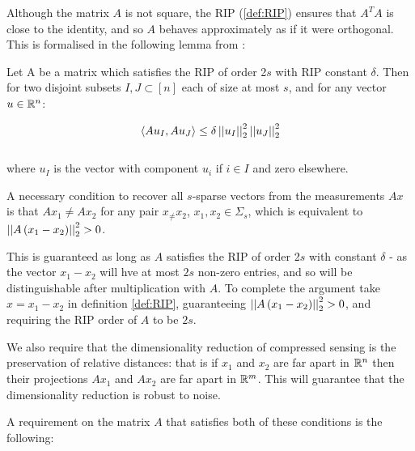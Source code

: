 \begin{remark}
Although the matrix \(A\) is not square, the RIP (\ref{def:RIP}) ensures that \(A^TA\) is close to the identity, and so \(A\) behaves approximately as if it were orthogonal. This is formalised in the following lemma from \cite{shalev2014understanding}:

\begin{lemma}
Let A be a matrix which satisfies the RIP of order 2\(s\) with RIP constant \(\delta\). Then for two disjoint subsets \(I, J \subset \left[n\right]\) each of size at most \(s\), and for any vector \(u \in {\mathbb{R}}^n\):

\begin{equation}
\langle Au_I, Au_J \rangle \leq \delta \left|\left|u_I\right|\right|_2^2 \left|\left|u_J\right|\right|_2^2
\end{equation}
\\
where \(u_I\) is the vector with component \(u_i\) if \(i \in I\) and zero elsewhere.

\end{lemma}

\end{remark}

\begin{remark} 
A necessary condition to recover all \(s\)-sparse vectors from the measurements \(Ax\) is that \(Ax_1 \neq Ax_2\) for any pair \( x_ \neq x_2\), \(x_1, x_2 \in \Sigma_s\), which is equivalent to \(\left|\left|A\left(x_1 - x_2\right)\right|\right|_2^2 > 0\). 

This is guaranteed as long as \(A\) satisfies the RIP of order 2\(s\) with constant \(\delta\) - as the vector \(x_1 - x_2\) will hve at most \(2s\) non-zero entries, and so will be distinguishable after multiplication with \(A\). To complete the argument take \(x = x_1 - x_2\) in definition \eqref{def:RIP}, guaranteeing \(\left|\left|A\left(x_1 - x_2\right)\right|\right|_2^2 > 0 \), and requiring the RIP order of \(A\) to be \(2s\).
\end{remark}

\begin{remark} [Stability]
We also require that the dimensionality reduction of compressed sensing is the preservation of relative distances: that is if \(x_1\) and \(x_2\) are far apart in \({\mathbb{R}}^n\) then their projections \(Ax_1\) and \(Ax_2\) are far apart in \({\mathbb{R}}^m\). This will guarantee that the dimensionality reduction is robust to noise. 
\end{remark}

A requirement on the matrix \(A\) that satisfies both of these conditions is the following:

